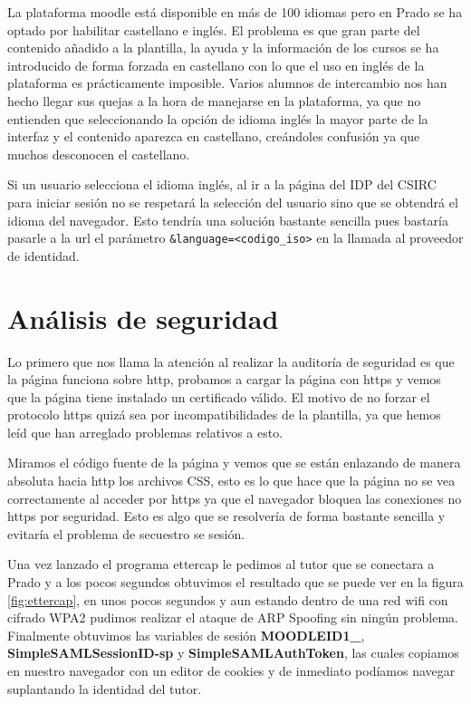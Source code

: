\bigskip
La plataforma moodle está disponible en más de 100 idiomas pero en Prado se ha optado por habilitar castellano e inglés. El problema es que gran parte del contenido añadido a la plantilla, la ayuda y la información de los cursos se ha introducido de forma forzada en castellano con lo que el uso en inglés de la plataforma es prácticamente imposible. Varios alumnos de intercambio nos han hecho llegar sus quejas a la hora de manejarse en la plataforma, ya que no entienden que seleccionando la opción de idioma inglés la mayor parte de la interfaz y el contenido aparezca en castellano, creándoles confusión ya que muchos desconocen el castellano.

\bigskip
Si un usuario selecciona el idioma inglés, al ir a la página del IDP del CSIRC para iniciar sesión no se respetará la selección del usuario sino que se obtendrá el idioma del navegador. Esto tendría una solución bastante sencilla pues bastaría pasarle a la url el parámetro \texttt{\&language=<codigo\_iso>} en la llamada al proveedor de identidad.


\section{Análisis de seguridad}

Lo primero que nos llama la atención al realizar la auditoría de seguridad es que la página funciona sobre http, probamos a cargar la página con https y vemos que la página tiene instalado un certificado válido. El motivo de no forzar el protocolo https quizá sea por incompatibilidades de la plantilla, ya que hemos leíd que han arreglado problemas relativos a esto\cite{art_11}. 

\bigskip
Miramos el código fuente de la página y vemos que se están enlazando de manera absoluta hacia http los archivos CSS, esto es lo que hace que la página no se vea correctamente al acceder por https ya que el navegador bloquea las conexiones no https por seguridad. Esto es algo que se resolvería de forma bastante sencilla y evitaría el problema de secuestro se sesión.

\bigskip
Una vez lanzado el programa ettercap le pedimos al tutor que se conectara a Prado y a los pocos segundos obtuvimos el resultado que se puede ver en la figura \ref{fig:ettercap}, en unos pocos segundos y aun estando dentro de una red wifi con cifrado WPA2 pudimos realizar el ataque de ARP Spoofing sin ningún problema. Finalmente obtuvimos las variables de sesión \textbf{MOODLEID1\_}, \textbf{SimpleSAMLSessionID-sp} y \textbf{SimpleSAMLAuthToken}, las cuales copiamos en nuestro navegador con un editor de cookies y de inmediato podíamos navegar suplantando la identidad del tutor.

